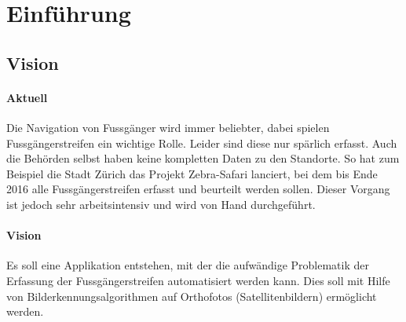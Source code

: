 \section{Einführung}
\subsection{Vision}
\label{subsec:vision}
\paragraph{Aktuell}
Die Navigation von Fussgänger wird immer beliebter, dabei spielen Fussgängerstreifen ein wichtige Rolle. Leider sind diese nur spärlich erfasst. Auch die Behörden selbst haben keine kompletten Daten zu den Standorte. So hat zum Beispiel die Stadt Zürich das Projekt Zebra-Safari lanciert, bei dem bis Ende 2016 alle Fussgängerstreifen erfasst und beurteilt werden sollen. Dieser Vorgang ist jedoch sehr arbeitsintensiv und wird von Hand durchgeführt.\\

\paragraph{Vision} 
Es soll eine Applikation entstehen, mit der die aufwändige Problematik der Erfassung der Fussgängerstreifen automatisiert werden kann. Dies soll mit Hilfe von Bilderkennungsalgorithmen auf Orthofotos (Satellitenbildern) ermöglicht werden. 